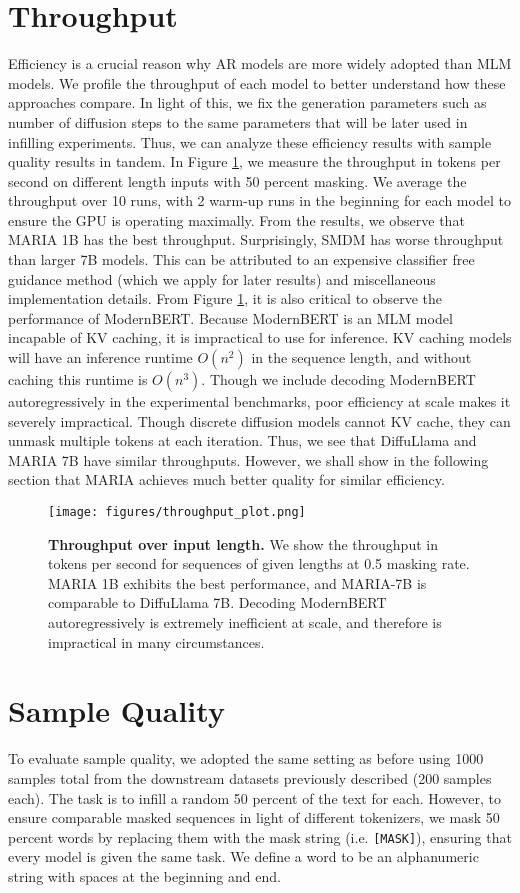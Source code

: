 \section*{Throughput}
Efficiency is a crucial reason why AR models are more widely adopted than MLM models. We profile the throughput of each model to better understand how these approaches compare. In light of this, we fix the generation parameters such as number of diffusion steps to the same parameters that will be later used in infilling experiments. Thus, we can analyze these efficiency results with sample quality results in tandem. In Figure \ref{fig:throughput}, we measure the throughput in tokens per second on different length inputs with 50 percent masking. We average the throughput over 10 runs, with 2 warm-up runs in the beginning for each model to ensure the GPU is operating maximally. From the results, we observe that MARIA 1B has the best throughput. Surprisingly, SMDM has worse throughput than larger 7B models. This can be attributed to an expensive classifier free guidance method (which we apply for later results) and miscellaneous implementation details. From Figure \ref{fig:throughput}, it is also critical to observe the performance of ModernBERT. Because ModernBERT is an MLM model incapable of KV caching, it is impractical to use for inference. KV caching models will have an inference runtime $O(n^2)$ in the sequence length, and without caching this runtime is $O(n^3)$. Though we include decoding ModernBERT autoregressively in the experimental benchmarks, poor efficiency at scale makes it severely impractical. Though discrete diffusion models cannot KV cache, they can unmask multiple tokens at each iteration. Thus, we see that DiffuLlama and MARIA 7B have similar throughputs. However, we shall show in the following section that MARIA achieves much better quality for similar efficiency.
\begin{figure}[t]
    \centering
    \texttt{[image: figures/throughput\_plot.png]}
    \caption{\textbf{Throughput over input length.} We show the throughput in tokens per second for sequences of given lengths at 0.5 masking rate. MARIA 1B exhibits the best performance, and MARIA-7B is comparable to DiffuLlama 7B. Decoding ModernBERT autoregressively is extremely inefficient at scale, and therefore is impractical in many circumstances.}
    \label{fig:throughput}
\end{figure}
\section*{Sample Quality}
To evaluate sample quality, we adopted the same setting as before using 1000 samples total from the downstream datasets previously described (200 samples each). The task is to infill a random 50 percent of the text for each. However, to ensure comparable masked sequences in light of different tokenizers, we mask 50 percent words by replacing them with the mask string (i.e. \texttt{[MASK]}), ensuring that every model is given the same task. We define a word to be an alphanumeric string with spaces at the beginning and end.

